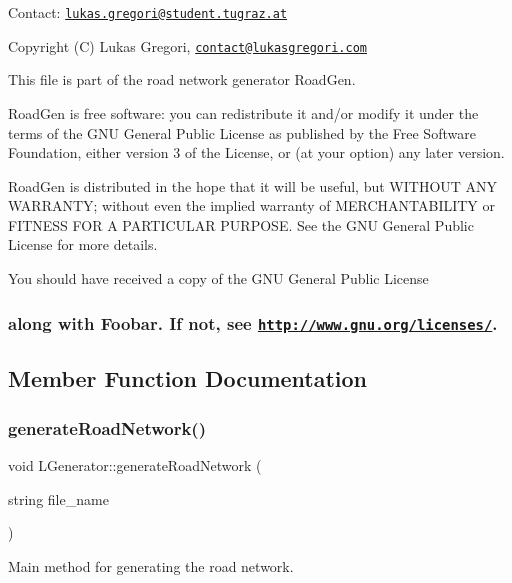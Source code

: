 Contact\+: \href{mailto:lukas.gregori@student.tugraz.at}{\tt lukas.\+gregori@student.\+tugraz.\+at}



 Copyright (C) Lukas Gregori, \href{mailto:contact@lukasgregori.com}{\tt contact@lukasgregori.\+com}

This file is part of the road network generator Road\+Gen.

Road\+Gen is free software\+: you can redistribute it and/or modify it under the terms of the G\+NU General Public License as published by the Free Software Foundation, either version 3 of the License, or (at your option) any later version.

Road\+Gen is distributed in the hope that it will be useful, but W\+I\+T\+H\+O\+UT A\+NY W\+A\+R\+R\+A\+N\+TY; without even the implied warranty of M\+E\+R\+C\+H\+A\+N\+T\+A\+B\+I\+L\+I\+TY or F\+I\+T\+N\+E\+SS F\+OR A P\+A\+R\+T\+I\+C\+U\+L\+AR P\+U\+R\+P\+O\+SE. See the G\+NU General Public License for more details.

You should have received a copy of the G\+NU General Public License \subsubsection*{along with Foobar. If not, see \href{http://www.gnu.org/licenses/}{\tt http\+://www.\+gnu.\+org/licenses/}. }

\subsection{Member Function Documentation}
\hypertarget{class_l_generator_a5cc3d77f073e6bed6218c2793addff7c}{}\label{class_l_generator_a5cc3d77f073e6bed6218c2793addff7c} 
\subsubsection{\texorpdfstring{generate\+Road\+Network()}{generateRoadNetwork()}}
{\footnotesize\ttfamily void L\+Generator\+::generate\+Road\+Network (\begin{DoxyParamCaption}\item[{string}]{file\+\_\+name }\end{DoxyParamCaption})}



Main method for generating the road network. 

